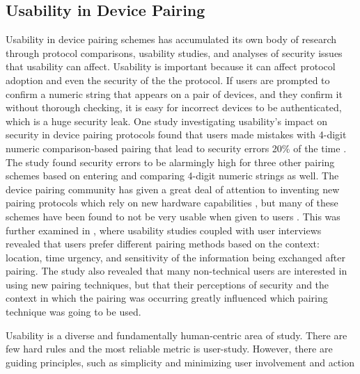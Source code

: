 \documentclass[12pt]{report}
\begin{document}
\subsection{Usability in Device Pairing}
Usability in device pairing schemes has accumulated its own body of research \cite{UsabilitySecurityOutOfBandPairingKainda2009,UserPerceptionPairing,PlayfulPairingGallego2011,AliceMeetsBobKumar2009,SecurePairingUsabilityUzun2007,ConferenceCompStudySecurePairingKumar2009} through protocol comparisons, usability studies, and analyses of security issues that usability can affect. Usability is important because it can affect protocol adoption and even the security of the the protocol. If users are prompted to confirm a numeric string that appears on a pair of devices, and they confirm it without thorough checking, it is easy for incorrect devices to be authenticated, which is a huge security leak. One study investigating usability's impact on security in device pairing protocols found that users made mistakes with 4-digit numeric comparison-based pairing that lead to security errors 20\% of the time \cite{SecurePairingUsabilityUzun2007}. The study found security errors to be alarmingly high for three other pairing schemes based on entering and comparing 4-digit numeric strings as well. The device pairing community has given a great deal of attention to inventing new pairing protocols which rely on new hardware capabilities \cite{PlayfulPairingGallego2011,BedaSoriente2007,ShakeWellBeforeUseMayrhofer2009,SeeingIsBelievingMcCune2005,TalkingToStrangersSmetters2002,LoudAndClearGoodrich2006,HapadepSoriente2008,VisualChannelPairingSaxena2006}, but many of these schemes have been found to not be very usable when given to users \cite{SecurePairingUsabilityUzun2007,ConferenceCompStudySecurePairingKumar2009}. This was further examined in \cite{UserPerceptionPairing}, where usability studies coupled with user interviews revealed that users prefer different pairing methods based on the context: location, time urgency, and sensitivity of the information being exchanged after pairing. The study also revealed that many non-technical users are interested in using new pairing techniques, but that their perceptions of security and the context in which the pairing was occurring greatly influenced which pairing technique was going to be used. \par

Usability is a diverse and fundamentally human-centric area of study. There are few hard rules and the most reliable metric is user-study. However, there are guiding principles, such as simplicity and minimizing user involvement and action \par
\end{document}
